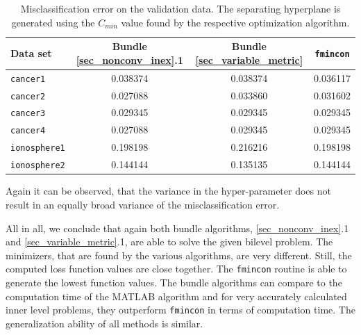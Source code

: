 \begin{table}[ht]%
\centering
\begin{tabular}{|l|c|c|c|}
	\hline
	Data set & Bundle \ref{sec_nonconv_inex}.1 & Bundle \ref{sec_variable_metric} & \texttt{fmincon} \\
	\hline
	\texttt{cancer1} & 0.038374 & 0.038374 & 0.036117\\
	\texttt{cancer2} & 0.027088 & 0.033860 & 0.031602\\
	\texttt{cancer3} & 0.029345 & 0.029345 & 0.029345\\
	\texttt{cancer4} & 0.027088 & 0.029345 & 0.029345\\
	\texttt{ionosphere1} & 0.198198 & 0.216216 & 0.198198\\
	\texttt{ionosphere2} & 0.144144 & 0.135135 & 0.144144\\
	\hline
\end{tabular}
\caption[Misclassification error for multigroup problem]{Misclassification error on the validation data. The separating hyperplane is generated using the \(C_{min}\) value found by the respective optimization algorithm.}
\label{misclass_mD}
\end{table}

Again it can be observed, that the variance in the hyper-parameter does not result in an equally broad variance of the misclassification error.

All in all, we conclude that again both bundle algorithms, \ref{sec_nonconv_inex}.1 and \ref{sec_variable_metric}.1, are able to solve the given bilevel problem.
The minimizers, that are found by the various algorithms, are very different. Still, the computed loss function values are close together. The \texttt{fmincon} routine is able to generate the lowest function values.
The bundle algorithms can compare to the computation time of the MATLAB algorithm and for very accurately calculated inner level problems, they outperform \texttt{fmincon} in terms of computation time.
The generalization ability of all methods is similar.






